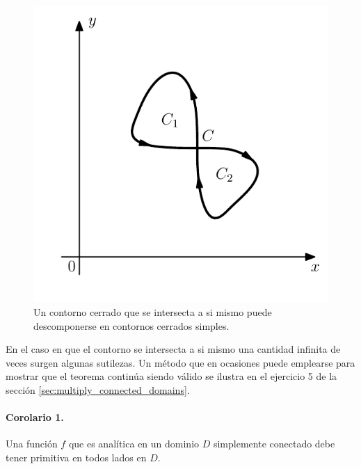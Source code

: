 \documentclass[a4paper]{report}
\begin{document}
\begin{figure}[!htb]
  \begin{minipage}[c]{0.42\textwidth}
    \includegraphics[width=\textwidth]{figuras/cauchy_goursat_theorem_not_simple_extension.pdf}
  \end{minipage}\hfill
  \begin{minipage}[c]{0.48\textwidth}
    \caption{
        Un contorno cerrado que se intersecta a si mismo puede descomponerse en contornos cerrados simples.
    }\label{fig:cauchy_goursat_theorem_not_simple_extension}
  \end{minipage}
\end{figure}

En el caso en que el contorno se intersecta a si mismo una cantidad infinita de veces surgen algunas sutilezas. Un método que en ocasiones puede emplearse para mostrar que el teorema continúa siendo válido se ilustra en el ejercicio 5 de la sección \ref{sec:multiply_connected_domains}.

\paragraph{Corolario 1.} Una función \(f\) que es analítica en un dominio \(D\) simplemente conectado debe tener primitiva en todos lados en \(D\).
\end{document}
